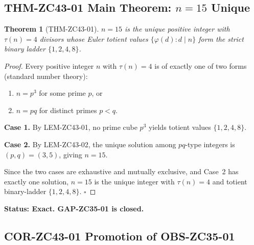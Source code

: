 \documentclass[12pt, a4paper]{article}
\newtheorem{theorem}{Theorem}[section]
\providecommand{\phitot}{\varphi}
\begin{document}
\subsection{THM-ZC43-01 \quad Main Theorem: \texorpdfstring{$n = 15$}{n = 15} Unique}


\begin{formalbox}[title={THM-ZC43-01: $n = 15$ is the Unique
  Binary-Ladder Integer (Exact)}]

\begin{theorem}[THM-ZC43-01]
\label{thm:zc43-01}
$n = 15$ is the unique positive integer with $\tau(n) = 4$
divisors whose Euler totient values $\{\phitot(d) : d \mid n\}$
form the strict binary ladder $\{1, 2, 4, 8\}$.
\end{theorem}

\begin{proof}
Every positive integer $n$ with $\tau(n) = 4$ is of exactly
one of two forms (standard number theory):
\begin{enumerate}[leftmargin=*, noitemsep]
\item $n = p^3$ for some prime $p$, or
\item $n = pq$ for distinct primes $p < q$.
\end{enumerate}

\textbf{Case 1.} By LEM-ZC43-01, no prime cube $p^3$ yields
totient values $\{1, 2, 4, 8\}$.

\textbf{Case 2.} By LEM-ZC43-02, the unique solution among
$pq$-type integers is $(p, q) = (3, 5)$, giving $n = 15$.

Since the two cases are exhaustive and mutually exclusive, and
Case~2 has exactly one solution, $n = 15$ is the unique integer
with $\tau(n) = 4$ and totient binary-ladder $\{1, 2, 4, 8\}$.
\hfill$\square$
\end{proof}

\textbf{Status: Exact. GAP-ZC35-01 is closed.}
\end{formalbox}

\subsection{COR-ZC43-01 \quad Promotion of OBS-ZC35-01}
\end{document}
